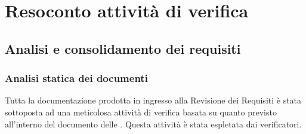 \section{Resoconto attività di verifica} \label{_resocontoVerifica}

\subsection{Analisi e consolidamento dei requisiti}

\subsubsection{Analisi statica dei documenti}
Tutta la documentazione prodotta in ingresso alla Revisione dei Requisiti è stata sottoposta ad una meticolosa attività di verifica
basata su quanto previsto all'interno del documento delle .
Questa attività è stata espletata dai verificatori.

